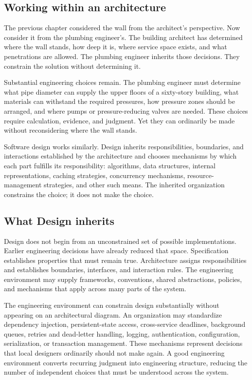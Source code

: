 \subsection{Working within an architecture}\label{working-within-an-architecture}

The previous chapter considered the wall from the architect's perspective.
Now consider it from the plumbing engineer's.
The building architect has determined where the wall stands, how deep it is, where service space exists, and what penetrations are allowed.
The plumbing engineer inherits those decisions.
They constrain the solution without determining it.

Substantial engineering choices remain.
The plumbing engineer must determine what pipe diameter can supply the upper floors of a sixty-story building, what materials can withstand the required pressures, how pressure zones should be arranged, and where pumps or pressure-reducing valves are needed.
These choices require calculation, evidence, and judgment.
Yet they can ordinarily be made without reconsidering where the wall stands.

Software design works similarly.
Design inherits responsibilities, boundaries, and interactions established by the architecture and chooses mechanisms by which each part fulfills its responsibility: algorithms, data structures, internal representations, caching strategies, concurrency mechanisms, resource-management strategies, and other such means.
The inherited organization constrains the choice; it does not make the choice.

\subsection{What Design inherits}\label{what-design-inherits}

Design does not begin from an unconstrained set of possible implementations.
Earlier engineering decisions have already reduced that space.
Specification establishes properties that must remain true.
Architecture assigns responsibilities and establishes boundaries, interfaces, and interaction rules.
The engineering environment may supply frameworks, conventions, shared abstractions, policies, and mechanisms that apply across many parts of the system.

The engineering environment can constrain design substantially without appearing on an architectural diagram.
An organization may standardize dependency injection, persistent-state access, cross-service deadlines, background queues, retries and dead-letter handling, logging, authentication, configuration, serialization, or transaction management.
These mechanisms represent decisions that local designers ordinarily should not make again.
A good engineering environment converts recurring judgment into engineering structure, reducing the number of independent choices that must be understood across the system.

